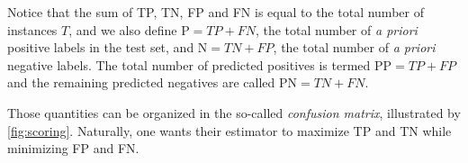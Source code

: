 %
Notice that the sum of TP, TN, FP and FN is equal to the total number of instances $T$, and we also define $\text{P}=TP+FN$, the total number of \textit{a priori} positive labels in the test set, and $\text{N}=TN+FP$, the total number of \textit{a priori} negative labels. The total number of predicted positives is termed $\text{PP}=TP+FP$ and the remaining predicted negatives are called $\text{PN}=TN+FN$.%


Those quantities can be organized in the so-called \emph{confusion matrix}, illustrated by \autoref{fig:scoring}.
%
Naturally, one wants their estimator to maximize TP and TN while minimizing FP and FN.

